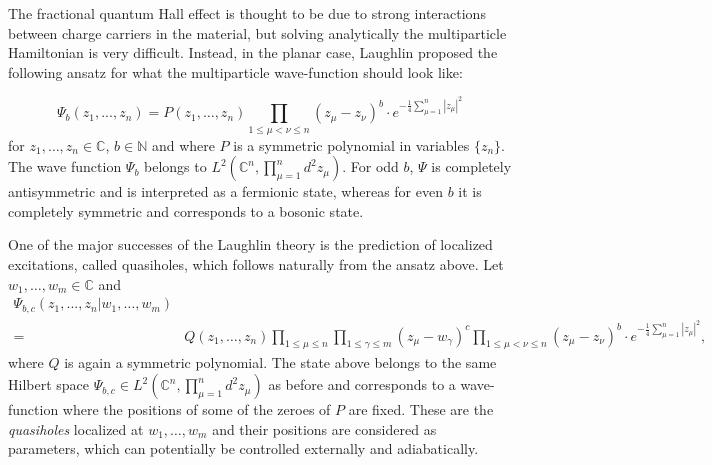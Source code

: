 \documentclass{article}
\theoremstyle{definition}
\renewcommand{\leq}{\leqslant}
\begin{document}
The fractional quantum Hall effect is thought to be due to strong interactions between charge carriers in the material, but solving analytically the multiparticle Hamiltonian is very difficult. Instead, in the planar case, Laughlin proposed the following ansatz for what the multiparticle wave-function should look like: 


$$\Psi_b(z_1,...,z_n)=P(z_1,\dots,z_n)\prod_{1\leq \mu<\nu \leq n}(z_\mu-z_\nu)^b \cdot e^{-\frac{1}{4}\sum_{\mu=1}^n|z_\mu|^2}$$ for $z_1,\dots,z_n \in \mathbb{C}$, $b\in\mathbb N$ and where $P$ is a symmetric polynomial in variables $\{z_n\}$. The wave function $\Psi_b$ belongs to $L^2(\mathbb{C}^n, \prod_{\mu=1}^n d^2 z_\mu)$. For odd $b$, $\Psi$ is completely antisymmetric and is interpreted as a fermionic state, whereas for even $b$ it is completely symmetric and corresponds to a bosonic state.


One of the major successes of the Laughlin theory is the prediction of localized excitations, called quasiholes, which follows naturally from the ansatz above. 
Let $w_1,\dots,w_m \in \mathbb{C}$ and
\begin{align}\label{Psib}\nonumber
\Psi_{b,c}(z_1,...,z_n|w_1,\dots,w_m)&\\=&Q(z_1,\dots,z_n)\prod_{1\leq\mu\leq n}\prod_{1\leq\gamma\leq m}(z_\mu-w_\gamma)^c \prod_{1 \leq \mu<\nu \leq n}(z_\mu-z_\nu)^b \cdot e^{-\frac{1}{4}\sum_{\mu=1}^n|z_\mu|^2},
\end{align} 
where $Q$ is again a symmetric polynomial. The state above  belongs to the same Hilbert space $\Psi_{b,c}\in L^2(\mathbb{C}^n, \prod_{\mu=1}^n d^2 z_\mu)$ as before and corresponds to a wave-function where the positions of some of the zeroes of $P$ are fixed. These are the \textit{quasiholes}  localized at $w_1,\dots,w_m$ and their positions are considered as parameters, which can potentially be controlled externally and adiabatically. 
\end{document}
